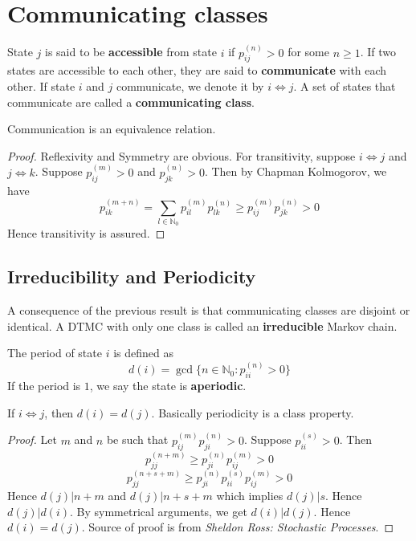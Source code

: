 \documentclass[a4paper,10pt]{article}
\begin{document}
\section{Communicating classes}
\begin{defn}
State $j$ is said to be \textbf{accessible} from state $i$ if $p_{ij}^{(n)} >0$ for some $n \geq 1$. If two states are accessible to each other, they are said to \textbf{communicate} with each other. If state $i$ and $j$ communicate, we denote it by $i \iff j$. A set of states that communicate are called a \textbf{communicating class}.
\end{defn}

\begin{prop}
Communication is an equivalence relation. 
\end{prop}
\begin{proof}
Reflexivity and Symmetry are obvious. For transitivity, suppose $i \iff j$ and $j \iff k$. Suppose $p_{ij}^{(m)} >0$ and $p_{jk}^{(n)} >0$. Then by Chapman Kolmogorov, we have
\[p_{ik}^{(m+n)} = \sum_{l \in \mathbb{N}_0} p_{il}^{(m)}p_{lk}^{(n)} \geq p_{ij}^{(m)}p_{jk}^{(n)} >0  \]
Hence transitivity is assured.
\end{proof}

\subsection{Irreducibility and Periodicity}
A consequence of the previous result is that communicating classes are disjoint or identical. A DTMC with only one class is called an \textbf{irreducible} Markov chain.
\begin{defn}
The period of state $i$ is defined as
\[d(i) = \gcd\{n \in \mathbb{N}_0 : p_{ii}^{(n)} > 0\}\]
If the period is $1$, we say the state is \textbf{aperiodic}.
\end{defn}

\begin{prop}
If $i \iff j$, then $d(i) = d(j)$. Basically periodicity is a class property.
\end{prop}
\begin{proof}
Let $m$ and $n$ be such that $p_{ij}^{(m)}p_{ji}^{(n)} > 0$. Suppose $p_{ii}^{(s)} > 0$. Then
\[ p_{jj}^{(n+m)} \geq p_{ji}^{(n)}p_{ij}^{(m)} > 0 \]
\[ p_{jj}^{(n+s+m)} \geq p_{ji}^{(n)}p_{ii}^{(s)}p_{ij}^{(m)} > 0 \]
Hence $d(j) | n+m$ and $d(j) | n+s+m$ which implies $d(j) | s$. Hence $d(j) | d(i)$. By symmetrical arguments, we get $d(i) | d(j)$. Hence $d(i) = d(j)$.
Source of proof is from \emph{Sheldon Ross: Stochastic Processes}.
\end{proof}
\end{document}
